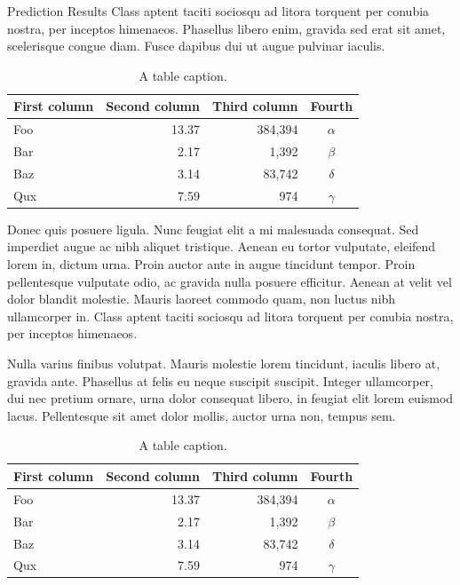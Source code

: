 \documentclass[final]{beamer}
\newlength{\colwidth}
\begin{document}
\begin{frame}[t]
\begin{columns}[t]
\begin{column}{\colwidth}
\begin{block}{Prediction Results}
    Class aptent taciti sociosqu ad litora torquent per conubia nostra, per
    inceptos himenaeos. Phasellus libero enim, gravida sed erat sit amet,
    scelerisque congue diam. Fusce dapibus dui ut augue pulvinar iaculis.

    \begin{table}
      \centering
      \begin{tabular}{l r r c}
        \toprule
        \textbf{First column} & \textbf{Second column} & \textbf{Third column} & \textbf{Fourth} \\
        \midrule
        Foo & 13.37 & 384,394 & $\alpha$ \\
        Bar & 2.17 & 1,392 & $\beta$ \\
        Baz & 3.14 & 83,742 & $\delta$ \\
        Qux & 7.59 & 974 & $\gamma$ \\
        \bottomrule
      \end{tabular}
      \caption{A table caption.}
    \end{table}

    Donec quis posuere ligula. Nunc feugiat elit a mi malesuada consequat. Sed
    imperdiet augue ac nibh aliquet tristique. Aenean eu tortor vulputate,
    eleifend lorem in, dictum urna. Proin auctor ante in augue tincidunt
    tempor. Proin pellentesque vulputate odio, ac gravida nulla posuere
    efficitur. Aenean at velit vel dolor blandit molestie. Mauris laoreet
    commodo quam, non luctus nibh ullamcorper in. Class aptent taciti sociosqu
    ad litora torquent per conubia nostra, per inceptos himenaeos.

    Nulla varius finibus volutpat. Mauris molestie lorem tincidunt, iaculis
    libero at, gravida ante. Phasellus at felis eu neque suscipit suscipit.
    Integer ullamcorper, dui nec pretium ornare, urna dolor consequat libero,
    in feugiat elit lorem euismod lacus. Pellentesque sit amet dolor mollis,
    auctor urna non, tempus sem.
\begin{table}
      \centering
      \begin{tabular}{l r r c}
        \toprule
        \textbf{First column} & \textbf{Second column} & \textbf{Third column} & \textbf{Fourth} \\
        \midrule
        Foo & 13.37 & 384,394 & $\alpha$ \\
        Bar & 2.17 & 1,392 & $\beta$ \\
        Baz & 3.14 & 83,742 & $\delta$ \\
        Qux & 7.59 & 974 & $\gamma$ \\
        \bottomrule
      \end{tabular}
      \caption{A table caption.}
    \end{table}
  \end{block}


\end{column}
\end{columns}
\end{frame}
\end{document}
